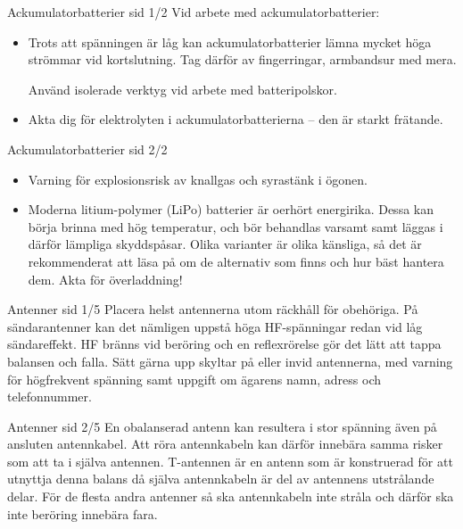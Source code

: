\documentclass{beamer}
\begin{document}
\begin{frame}{Ackumulatorbatterier sid 1/2}
Vid arbete med ackumulatorbatterier:

\begin{itemize}
	\item Trots att spänningen är låg kan ackumulatorbatterier lämna
	mycket höga strömmar vid kortslutning.
	Tag därför av fingerringar, armbandsur med mera.
	
	Använd isolerade verktyg vid arbete med batteripolskor.
	\item Akta dig för elektrolyten i ackumulatorbatterierna -- den är
	starkt frätande.
\end{itemize}
\end{frame}

\begin{frame}{Ackumulatorbatterier sid 2/2}
\begin{itemize}
	\item Varning för explosionsrisk av knallgas och syrastänk i ögonen.
	\item Moderna litium-polymer (LiPo) batterier är oerhört energirika.
	Dessa kan börja brinna med hög temperatur, och bör behandlas varsamt samt
	läggas i därför lämpliga skyddspåsar.
	Olika varianter är olika känsliga, så det är rekommenderat att läsa på om
	de alternativ som finns och hur bäst hantera dem.
	Akta för överladdning!
\end{itemize}
\end{frame}

\begin{frame}{Antenner sid 1/5}
Placera helst antennerna utom räckhåll för obehöriga.
På sändarantenner kan det nämligen uppstå höga HF-spänningar redan vid
låg sändareffekt.
HF bränns vid beröring och en reflexrörelse gör det lätt att tappa balansen och
falla.
Sätt gärna upp skyltar på eller invid antennerna, med varning för högfrekvent
spänning samt uppgift om ägarens namn, adress och telefonnummer.
\end{frame}

\begin{frame}{Antenner sid 2/5}
En obalanserad antenn kan resultera i stor spänning även på ansluten
antennkabel.
Att röra antennkabeln kan därför innebära samma risker som att ta i själva
antennen.
T-antennen är en antenn som är konstruerad för att utnyttja denna balans då
själva antennkabeln är del av antennens utstrålande delar.
För de flesta andra antenner så ska antennkabeln inte stråla och därför ska inte
beröring innebära fara.
\end{frame}
\end{document}
